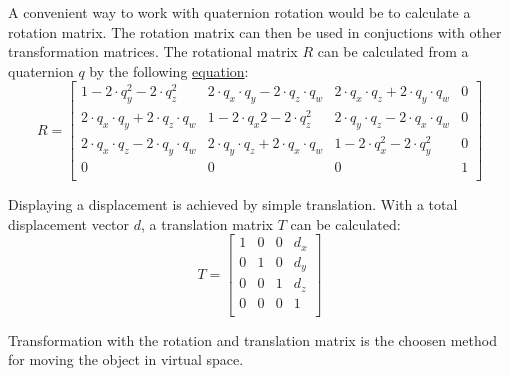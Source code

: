 A convenient way to work with quaternion rotation would be to calculate a rotation matrix.
The rotation matrix can then be used in conjuctions with other transformation matrices. 
The rotational matrix $R$ can be calculated from a quaternion $q$ by the following \href{https://www.euclideanspace.com/maths/geometry/rotations/conversions/quaternionToMatrix/index.htm}{equation}:
\begin{equation}
    R =
    \left[ {\begin{array}{cccc}
        1 - 2\cdot q_y^2 - 2\cdot q_z^2 & 2\cdot q_x\cdot q_y - 2\cdot q_z\cdot q_w & 2\cdot q_x \cdot q_z + 2 \cdot q_y \cdot q_w & 0 \\
        2\cdot q_x \cdot q_y + 2 \cdot q_z \cdot q_w & 1 - 2 \cdot q_x2 - 2\cdot q_z^2 & 2\cdot q_y \cdot q_z - 2 \cdot q_x \cdot q_w & 0 \\
        2\cdot q_x \cdot q_z - 2 \cdot q_y \cdot q_w & 2\cdot q_y \cdot q_z + 2\cdot q_x \cdot q_w & 1 - 2 \cdot q_x^2 - 2 \cdot q_y^2 & 0 \\
        0 & 0 & 0 & 1 \\
    \end{array} } \right]
\end{equation}

Displaying a displacement is achieved by simple translation. 
With a total displacement vector $d$, a translation matrix $T$ can be calculated:
\begin{equation}
    T = \left[ {\begin{array}{cccc}
        1 & 0 & 0 & d_x \\
        0 & 1 & 0 & d_y \\
        0 & 0 & 1 & d_z \\
        0 & 0 & 0 & 1 \\
    \end{array} } \right]
\end{equation}

Transformation with the rotation and translation matrix is the choosen method for moving the object in virtual space.